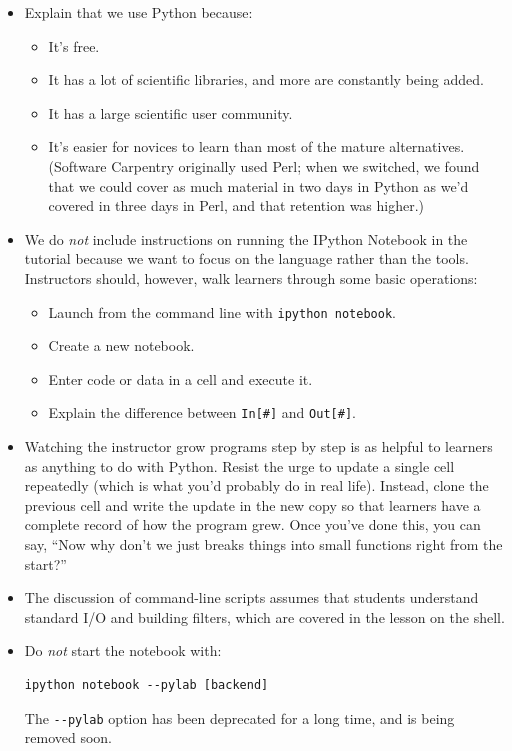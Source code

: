 \documentclass[]{book}
\begin{document}
\begin{itemize}
\item
  Explain that we use Python because:

  \begin{itemize}
  \item
    It's free.
  \item
    It has a lot of scientific libraries, and more are constantly being
    added.
  \item
    It has a large scientific user community.
  \item
    It's easier for novices to learn than most of the mature
    alternatives. (Software Carpentry originally used Perl; when we
    switched, we found that we could cover as much material in two days
    in Python as we'd covered in three days in Perl, and that retention
    was higher.)
  \end{itemize}
\item
  We do \emph{not} include instructions on running the IPython Notebook
  in the tutorial because we want to focus on the language rather than
  the tools. Instructors should, however, walk learners through some
  basic operations:

  \begin{itemize}
  \item
    Launch from the command line with \texttt{ipython notebook}.
  \item
    Create a new notebook.
  \item
    Enter code or data in a cell and execute it.
  \item
    Explain the difference between \texttt{In{[}\#{]}} and
    \texttt{Out{[}\#{]}}.
  \end{itemize}
\item
  Watching the instructor grow programs step by step is as helpful to
  learners as anything to do with Python. Resist the urge to update a
  single cell repeatedly (which is what you'd probably do in real life).
  Instead, clone the previous cell and write the update in the new copy
  so that learners have a complete record of how the program grew. Once
  you've done this, you can say, ``Now why don't we just breaks things
  into small functions right from the start?''
\item
  The discussion of command-line scripts assumes that students
  understand standard I/O and building filters, which are covered in the
  lesson on the shell.
\item
  Do \emph{not} start the notebook with:

\begin{verbatim}
ipython notebook --pylab [backend]
\end{verbatim}

  The \texttt{-{}-pylab} option has been deprecated for a long time, and
  is being removed soon.
\end{itemize}
\end{document}
